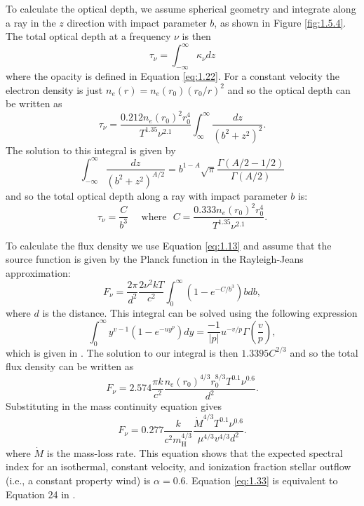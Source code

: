 To calculate the optical depth, we assume spherical geometry and integrate along a ray in the $z$ direction with impact parameter $b$, as shown in Figure \ref{fig:1.5.4}. The total optical depth at a frequency $\nu$ is then
\begin{equation}
\tau _{\nu} = \int ^{\infty} _{-\infty} \kappa _{\nu} dz
\end{equation}
where the opacity is defined in Equation \ref{eq:1.22}. For a constant velocity the electron density is just $n_{e}(r)=n_{e}(r_{0})(r_{0}/r)^2$ and so the optical depth can be written as
\begin{equation}
\tau _{\nu} = \frac{0.212n_{e}(r_{0})^2r_{0}^4}{T^{1.35}\nu ^{2.1}}\int ^{\infty} _{\infty}\frac{dz}{(b^2 + z^2)^2}.
\end{equation}
The solution to this integral is given by \citep{gradshteyn_1994}
\begin{equation}
\int ^{\infty} _{-\infty} \frac{dz}{(b^2 + z^2)^{A/2}}=b^{1-A}\sqrt{\pi}\frac{\Gamma (A/2 -1/2)}{\Gamma (A/2)}
\end{equation}
and so the total optical depth along a ray with impact parameter $b$ is:
\begin{equation}
\tau _{\nu} = \frac{C}{b^3}\ \ \ \ \ \ \mathrm{where}\ \ \ C=\frac{0.333n_{e}(r_{0})^2r_{0}^4}{T^{1.35}\nu ^{2.1}}.
\end{equation}

To calculate the flux density we use Equation \ref{eq:1.13} and assume that the source function is given by the Planck function in the Rayleigh-Jeans approximation:
\begin{equation}
F_{\nu} = \frac{2\pi}{d^2}\frac{2\nu ^2 kT}{c^2} \int ^{\infty} _{0}(1-e^{-C/b^3})bdb,
\end{equation}
where $d$ is the distance. This integral can be solved using the following expression
\begin{equation}
\int ^{\infty} _{0}y^{v-1}(1-e^{-uy^p})dy=\frac{-1}{|p|}u^{-v/p}\Gamma \left(\frac{v}{p} \right),
\end{equation}
which is given in \cite{gradshteyn_1994}. The solution to our integral is then $1.3395C^{2/3}$ and so the total flux density can be written as 
\begin{equation}\label{eq:1.32}
F_{\nu} = 2.574\frac{\pi k}{c^2}\dfrac{n_e(r_0)^{4/3}r_0^{8/3}T^{0.1}\nu ^{0.6}}{d^2}.
\end{equation}
Substituting in the mass continuity equation gives
\begin{equation}\label{eq:1.33}
F_{\nu} = 0.277\frac{k}{c^2 m_{\mathrm{H}}^{4/3}}\dfrac{\dot{M}^{4/3}T^{0.1}\nu ^{0.6}}{\mu ^{4/3}v^{4/3}d^2}.
\end{equation}
where $\dot{M}$ is the mass-loss rate. This equation shows that the expected spectral index for an isothermal, constant velocity, and ionization fraction stellar outflow (i.e., a constant property wind) is $\alpha =0.6$. Equation \ref{eq:1.33} is equivalent to Equation 24 in \cite{panagia_1975}.

